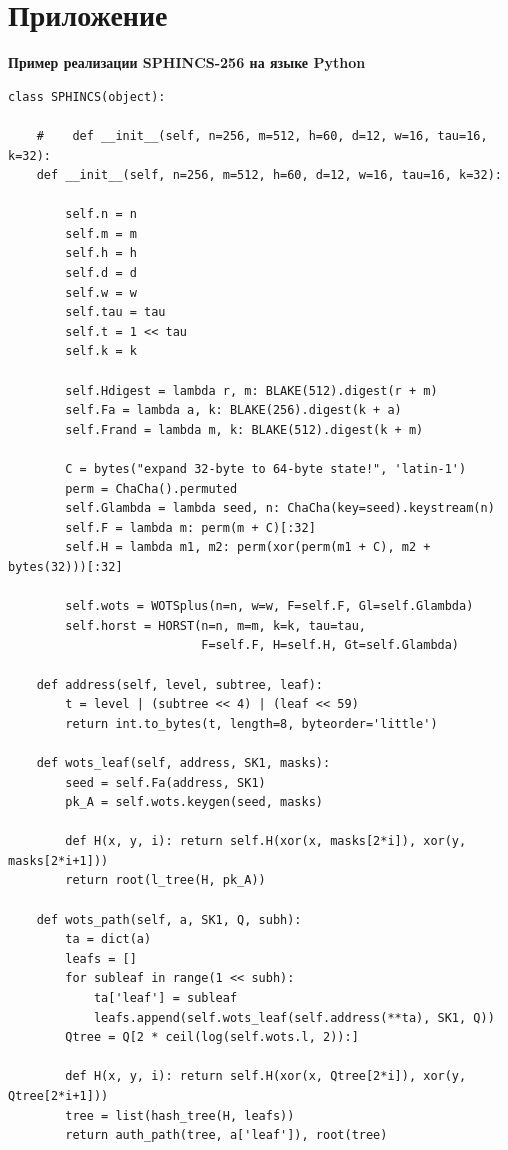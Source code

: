 \documentclass[a4paper, 14pt]{extarticle}
\begin{document}
\section*{Приложение}
\textbf{Пример реализации SPHINCS-256 на языке Python}
\begin{verbatim}
class SPHINCS(object):

    #    def __init__(self, n=256, m=512, h=60, d=12, w=16, tau=16, k=32):
    def __init__(self, n=256, m=512, h=60, d=12, w=16, tau=16, k=32):

        self.n = n
        self.m = m
        self.h = h
        self.d = d
        self.w = w
        self.tau = tau
        self.t = 1 << tau
        self.k = k

        self.Hdigest = lambda r, m: BLAKE(512).digest(r + m)
        self.Fa = lambda a, k: BLAKE(256).digest(k + a)
        self.Frand = lambda m, k: BLAKE(512).digest(k + m)

        C = bytes("expand 32-byte to 64-byte state!", 'latin-1')
        perm = ChaCha().permuted
        self.Glambda = lambda seed, n: ChaCha(key=seed).keystream(n)
        self.F = lambda m: perm(m + C)[:32]
        self.H = lambda m1, m2: perm(xor(perm(m1 + C), m2 + bytes(32)))[:32]

        self.wots = WOTSplus(n=n, w=w, F=self.F, Gl=self.Glambda)
        self.horst = HORST(n=n, m=m, k=k, tau=tau,
                           F=self.F, H=self.H, Gt=self.Glambda)

    def address(self, level, subtree, leaf):
        t = level | (subtree << 4) | (leaf << 59)
        return int.to_bytes(t, length=8, byteorder='little')

    def wots_leaf(self, address, SK1, masks):
        seed = self.Fa(address, SK1)
        pk_A = self.wots.keygen(seed, masks)

        def H(x, y, i): return self.H(xor(x, masks[2*i]), xor(y, masks[2*i+1]))
        return root(l_tree(H, pk_A))

    def wots_path(self, a, SK1, Q, subh):
        ta = dict(a)
        leafs = []
        for subleaf in range(1 << subh):
            ta['leaf'] = subleaf
            leafs.append(self.wots_leaf(self.address(**ta), SK1, Q))
        Qtree = Q[2 * ceil(log(self.wots.l, 2)):]

        def H(x, y, i): return self.H(xor(x, Qtree[2*i]), xor(y, Qtree[2*i+1]))
        tree = list(hash_tree(H, leafs))
        return auth_path(tree, a['leaf']), root(tree)


\end{verbatim}
\end{document}
